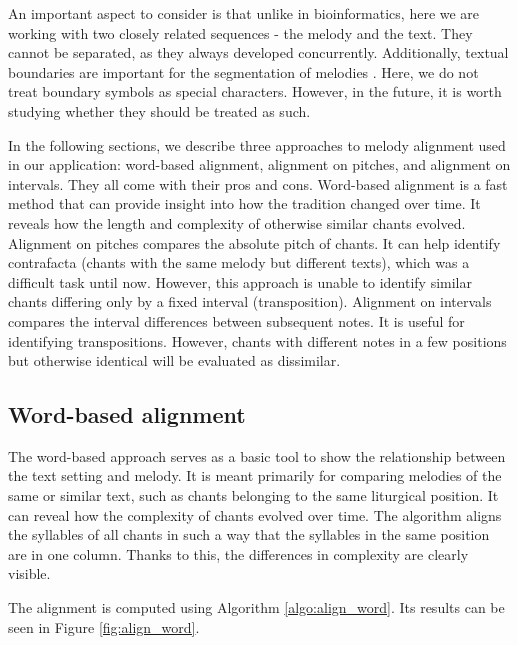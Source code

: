 An important aspect to consider is that unlike in bioinformatics, here we are working with two closely related sequences - the melody and the text. They cannot
be separated, as they always developed concurrently. Additionally, textual boundaries are important for the segmentation of melodies \citep{chant21}. Here, we
do not treat boundary symbols as special characters. However, in the future, it is worth studying whether they should be treated as such.

In the following sections, we describe three approaches to melody alignment used in our application: word-based alignment, alignment on pitches, and alignment on
intervals. They all come with their pros and cons. Word-based alignment is a fast method that can provide insight into how the tradition changed over time.
It reveals how the length and complexity of otherwise similar chants evolved. Alignment on pitches compares the absolute pitch of chants. It can help identify
contrafacta (chants with the same melody but different texts), which was a difficult task until now. However, this approach is unable to identify similar chants
differing only by a fixed interval (transposition). Alignment on intervals compares the interval differences between subsequent notes. It is useful for identifying
transpositions. However, chants with different notes in a few positions but otherwise identical will be evaluated as dissimilar.

\subsection{Word-based alignment}

The word-based approach serves as a basic tool to show the relationship between the text setting and melody. It is meant primarily for comparing melodies of
the same or similar text, such as chants belonging to the same liturgical position. It can reveal how the complexity of chants evolved over time.
The algorithm aligns the syllables of all chants in such a way that the syllables in the same position are in one column. Thanks to this, the differences
in complexity are clearly visible.

The alignment is computed using Algorithm \ref{algo:align_word}. Its results can be seen in Figure \ref{fig:align_word}.\newline

